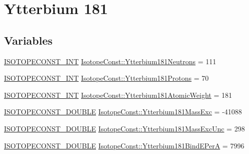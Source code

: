 \hypertarget{group___isotope_const-_ytterbium-_yb181}{}\section{Ytterbium 181}
\label{group___isotope_const-_ytterbium-_yb181}
\subsection*{Variables}
\begin{DoxyCompactItemize}
\item 
\mbox{\hyperlink{group___isotope_const-_macros_ga5f18360b3e99483a35c32d789e62621c}{I\+S\+O\+T\+O\+P\+E\+C\+O\+N\+S\+T\+\_\+\+I\+NT}} \mbox{\hyperlink{group___isotope_const-_ytterbium-_yb181_ga7d32a162021e9d935cad9b454734eacf}{Isotope\+Const\+::\+Ytterbium181\+Neutrons}} = 111
\item 
\mbox{\hyperlink{group___isotope_const-_macros_ga5f18360b3e99483a35c32d789e62621c}{I\+S\+O\+T\+O\+P\+E\+C\+O\+N\+S\+T\+\_\+\+I\+NT}} \mbox{\hyperlink{group___isotope_const-_ytterbium-_yb181_ga43ce584b3fa170a3f5cf3875549569de}{Isotope\+Const\+::\+Ytterbium181\+Protons}} = 70
\item 
\mbox{\hyperlink{group___isotope_const-_macros_ga5f18360b3e99483a35c32d789e62621c}{I\+S\+O\+T\+O\+P\+E\+C\+O\+N\+S\+T\+\_\+\+I\+NT}} \mbox{\hyperlink{group___isotope_const-_ytterbium-_yb181_gaeb8d86cd0d5cca7f541f40ddad15810f}{Isotope\+Const\+::\+Ytterbium181\+Atomic\+Weight}} = 181
\item 
\mbox{\hyperlink{group___isotope_const-_macros_ga8f45a7272ce02c0b4c65c44636ed719a}{I\+S\+O\+T\+O\+P\+E\+C\+O\+N\+S\+T\+\_\+\+D\+O\+U\+B\+LE}} \mbox{\hyperlink{group___isotope_const-_ytterbium-_yb181_ga9ab8b7e61181b18148a50bdb80812103}{Isotope\+Const\+::\+Ytterbium181\+Mass\+Exc}} = -\/41088
\item 
\mbox{\hyperlink{group___isotope_const-_macros_ga8f45a7272ce02c0b4c65c44636ed719a}{I\+S\+O\+T\+O\+P\+E\+C\+O\+N\+S\+T\+\_\+\+D\+O\+U\+B\+LE}} \mbox{\hyperlink{group___isotope_const-_ytterbium-_yb181_gaf1b1a8fd71df432a305890eef5623093}{Isotope\+Const\+::\+Ytterbium181\+Mass\+Exc\+Unc}} = 298
\item 
\mbox{\hyperlink{group___isotope_const-_macros_ga8f45a7272ce02c0b4c65c44636ed719a}{I\+S\+O\+T\+O\+P\+E\+C\+O\+N\+S\+T\+\_\+\+D\+O\+U\+B\+LE}} \mbox{\hyperlink{group___isotope_const-_ytterbium-_yb181_gad026a5a73594e8b8a1c5cc1ef0bdf674}{Isotope\+Const\+::\+Ytterbium181\+Bind\+E\+PerA}} = 7996
\item 

\end{DoxyCompactItemize}
